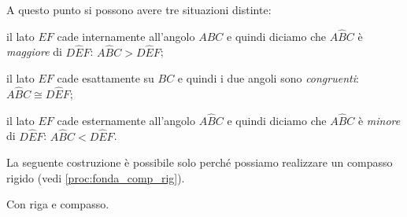 A questo punto si possono avere tre situazioni distinte:
\begin{itemize*}
\item il lato \(EF\) cade internamente all'angolo \(A\widehat{B}C\) e 
quindi diciamo che \(A\widehat{B}C\) è \emph{maggiore} di 
\(D\widehat{E}F\): \(A\widehat{B}C>D\widehat{E}F\);
\item il lato \(EF\) cade esattamente su \(BC\) e quindi i due angoli 
sono \emph{congruenti}: \(A\widehat{B}C\cong D\widehat{E}F\);
\item il lato \(EF\) cade esternamente all'angolo \(A\widehat{B}C\) e 
quindi diciamo che \(A\widehat{B}C\) è \emph{minore} di 
\(D\widehat{E}F\): \(A\widehat{B}C<D\widehat{E}F\).
\end{itemize*}

\begin{comment}
Puoi usare le seguenti righe per come schema da riempire ogni volta che 
vuoi 
descrivere una procedura
Le copi dove vuoi realizzare una procedura, aggiungi gli \item necessari, e 
ci 
copi dentro i pezzi di testo che hai già scritto.

Con riga e compasso.

\begin{procedura}[<nome della costruzione>]
 :
\begin{enumerate} [nosep]
\item 

\item 

\item 

\end{enumerate}
\end{procedura}

\ifcoding
Con la geometria interattiva.


\fi

\end{comment}
\begin{osservazione}
 La seguente costruzione è possibile solo perché possiamo realizzare un 
compasso rigido (vedi \ref{proc:fonda_comp_rig}).
\end{osservazione}

Con riga e compasso.

